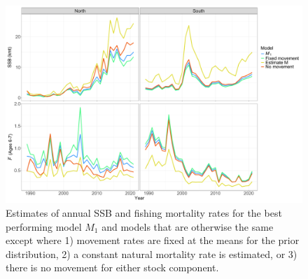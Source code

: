 \documentclass[
]{article}
\begin{document}
\begin{landscape}

\begin{figure}

{\centering \includegraphics[height=0.95\textheight]{SSB_F_sensitivity_plots} 

}

\caption{Estimates of annual SSB and fishing mortality rates for the best performing model $M_1$ and models that are otherwise the same except where  1) movement rates are fixed at the means for the prior distribution, 2) a constant natural mortality rate is estimated, or 3) there is no movement for either stock component.}\label{fig:sensitivity-plots}
\end{figure}
\end{landscape}
\end{document}
